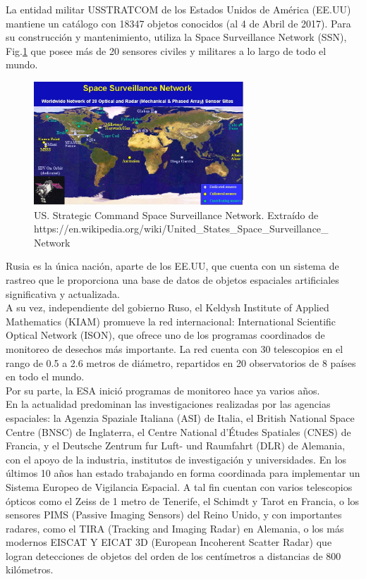 La entidad militar \ac{USSTRATCOM} de los Estados Unidos de Am\'erica (EE.UU) mantiene un catálogo con 18347 objetos conocidos (al 4 de Abril de 2017). Para su construcci\'on y mantenimiento, utiliza la Space Surveillance Network (SSN), Fig.\ref{fig:usnet}  que posee m\'as de 20 sensores civiles y militares a lo largo de todo el mundo.\\

\begin{figure}[!h]
  \centering
  \includegraphics[width=0.7\textwidth]{imagenes/SpSNet}
  \caption[USSTRATCOM - SSN]{US. Strategic Command Space Surveillance Network. Extra\'ido de https://en.wikipedia.org/wiki/United\_States\_Space\_Surveillance\_Network}
  \label{fig:usnet}
\end{figure}

Rusia es la \'unica naci\'on, aparte de los EE.UU, que cuenta con un sistema de rastreo que le proporciona una base de datos de objetos espaciales artificiales significativa y actualizada.\\
A su vez, independiente del gobierno Ruso, el Keldysh Institute of Applied Mathematics (KIAM) promueve la red internacional: International Scientific Optical Network (ISON), que ofrece uno de los programas coordinados de monitoreo de desechos m\'as importante.
La red cuenta con 30 telescopios en el rango de 0.5 a 2.6 metros de di\'ametro, repartidos en 20 observatorios de 8 pa\'ises en todo el mundo.\\

Por su parte, la ESA inici\'o programas de monitoreo hace ya varios a\~nos.\\
En la actualidad predominan las investigaciones realizadas por las agencias espaciales: la Agenzia Spaziale Italiana (ASI) de Italia, el  British National Space Centre (BNSC) de  Inglaterra, el Centre National d'Études Spatiales (CNES) de Francia, y el Deutsche Zentrum fur Luft- und Raumfahrt  (DLR) de Alemania, con el apoyo de la industria, institutos de investigaci\'on y universidades. En los \'ultimos 10 a\~nos han estado trabajando en forma coordinada para implementar un Sistema Europeo de Vigilancia Espacial.
A tal fin cuentan con varios telescopios \'opticos como el Zeiss de 1 metro de Tenerife, el Schimdt y Tarot en Francia, o los sensores PIMS (Passive Imaging Sensors) del Reino Unido, y con importantes radares, como el TIRA (Tracking and Imaging Radar) en Alemania, o los m\'as modernos EISCAT Y EICAT 3D (European Incoherent Scatter Radar) que logran detecciones de objetos del orden de los cent\'imetros a distancias de 800 kil\'ometros.


